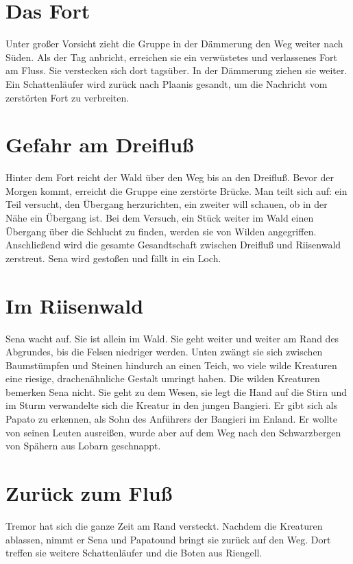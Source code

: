 \documentclass[12pt,a4paper,onecolumn,twoside,ngerman]{book}
\newcommand{\Sena}{Sena}
\newcommand{\Bangiri}{Bangieri}
\newcommand{\Papato}{Papato}
\newcommand{\Enland}{Enland}
\newcommand{\Schattenlaufer}{Schattenläufer}
\newcommand{\Tremor}{Tremor}
\newcommand{\Lobarn}{Lobarn}
\newcommand{\Rhingell}{Riengell}
\newcommand{\Dreifluss}{Dreifluß}
\newcommand{\Planis}{Plaanis}
\newcommand{\Grunland}{Grünland}
\newcommand{\Riesenwald}{Riisenwald}
\begin{document}
\section{Das Fort}
Unter großer Vorsicht zieht die Gruppe in der Dämmerung den Weg weiter nach Süden.\linebreak
Als der Tag anbricht, erreichen sie ein verwüstetes und verlassenes Fort am Fluss. Sie verstecken sich dort tagsüber. In der Dämmerung ziehen sie weiter. Ein  {\Schattenlaufer} wird zurück nach {\Planis} gesandt, um die Nachricht vom zerstörten Fort zu verbreiten.

\section{Gefahr am \Dreifluss}
Hinter dem Fort reicht der Wald über den Weg bis an den {\Dreifluss}. Bevor der Morgen kommt, erreicht die Gruppe eine zerstörte Brücke.\linebreak
Man teilt sich auf: ein Teil versucht, den Übergang herzurichten, ein zweiter will schauen, ob in der Nähe ein Übergang ist. Bei dem Versuch, ein Stück weiter im Wald einen Übergang über die Schlucht zu finden, werden sie von Wilden angegriffen. Anschließend wird die gesamte Gesandtschaft zwischen {\Dreifluss} und {\Riesenwald} zerstreut.  {\Sena} wird gestoßen und fällt in ein Loch.

\section{Im \Riesenwald}
{\Sena} wacht auf. Sie ist allein im Wald. Sie geht weiter und weiter am Rand des Abgrundes, bis die Felsen niedriger werden. Unten zwängt sie sich zwischen Baumstümpfen und Steinen hindurch an einen Teich, wo viele wilde Kreaturen eine riesige, drachenähnliche Gestalt umringt haben.\linebreak
Die wilden Kreaturen bemerken {\Sena} nicht. Sie geht zu dem Wesen, sie legt die Hand auf die Stirn und im Sturm verwandelte sich die Kreatur in den jungen {\Bangiri}. Er gibt sich als {\Papato} zu erkennen, als Sohn des Anführers der {\Bangiri} im {\Enland}. Er wollte von seinen Leuten ausreißen, wurde aber auf dem Weg nach den Schwarzbergen von Spähern aus {\Lobarn} geschnappt. 

\section{Zurück zum Fluß}
{\Tremor} hat sich die ganze Zeit am Rand versteckt. Nachdem die Kreaturen ablassen, nimmt er {\Sena} und \Papato  und bringt sie zurück auf den Weg. Dort treffen sie weitere {\Schattenlaufer} und die Boten aus {\Rhingell}.
\end{document}
